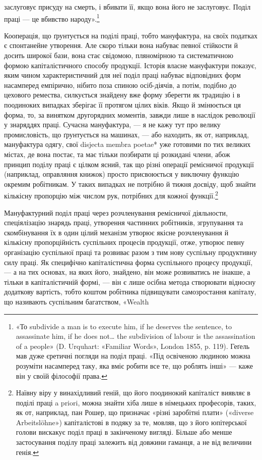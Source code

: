 \parcont{}  %
заслуговує присуду на смерть, і вбивати її, якщо вона його не
заслуговує. Поділ праці — це вбивство народу».\footnote{
«То subdivide a man is to execute him, if he deserves the sentence,
to assassinate him, if he does not\dots{} the subdivision of labour is the assassination
of a people» (D. Urquhart: «Familiar Words», London 1855,
p. 119). Геґель мав дуже єретичні погляди на поділ праці. «Під освіченою
людиною можна розуміти насамперед таку, яка вміє робити все
те, що роблять інші» — каже він у своїй філософії права.
}

Кооперація, що ґрунтується на поділі праці, тобто мануфактура,
на своїх податках є спонтанейне утворення. Але скоро
тільки вона набуває певної стійкости й досить широкої бази,
вона стає свідомою, пляномірною та систематичною формою капіталістичного
способу продукції. Історія власне мануфактури
показує, яким чином характеристичний для неї поділ праці
набуває відповідних форм насамперед емпірично, нібито поза
спиною осіб-діячів, а потім, подібно до цехового ремества, силкується
знайдену вже форму зберегти як традицію і в поодиноких
випадках зберігає її протягом цілих віків. Якщо й змінюється
ця форма, то, за винятком другорядних моментів, завжди лише в
наслідок революції у знаряддях праці. Сучасна мануфактура, —
я не кажу тут про велику промисловість, що ґрунтується на
машинах, — або находить, як от, наприклад, мануфактура одягу,
свої disjecta membra poetae* уже готовими по тих великих містах,
де вона постає, та має тільки позбирати ці розкидані члени,
абож принцип поділу праці є цілком ясний, так що різні
операції ремісничої продукції (наприклад, оправляння книжок)
просто присвоюється у виключну функцію окремим робітникам.
У таких випадках не потрібно й тижня досвіду, щоб знайти
кількісну пропорцію між числом рук, потрібних для кожної
функції.\footnote{
Наївну віру у винахідливий геній, що його поодинокий капіталіст
виявляє в поділі праці a priori, можна знайти хіба лише в німецьких
професорів, таких, як от, наприклад, пан Рошер, що призначає «різні
заробітні плати» («diverse Arbeitslöhne») капіталістові в подяку за те,
мовляв, що з його юпітерської голови вискакує поділ праці в закінченому
вигляді. Більше або менше застосування поділу праці залежить від
довжини гаманця, а не від величини генія.
}

Мануфактурний поділ праці через розчленування ремісничої
діяльности, спеціялізацію знарядь праці, утворення частинних
робітників, згрупування та скомбінування їх в один цілий механізм
утворює якісне розчленування й кількісну пропорційність
суспільних процесів продукції, отже, утворює певну організацію
суспільної праці та розвиває разом з тим нову суспільну продуктивну
силу праці. Як специфічно капіталістична форма суспільного
процесу продукції, — а на тих основах, на яких його,
знайдено, він може розвиватись не інакше, а тільки в капіталістичній
формі, — він є лише осібна метода створювати відносну додаткову
вартість, тобто коштом робітника підвищувати самозростання
капіталу, що називають суспільним багатством, «Wealth
\parbreak{}  %
